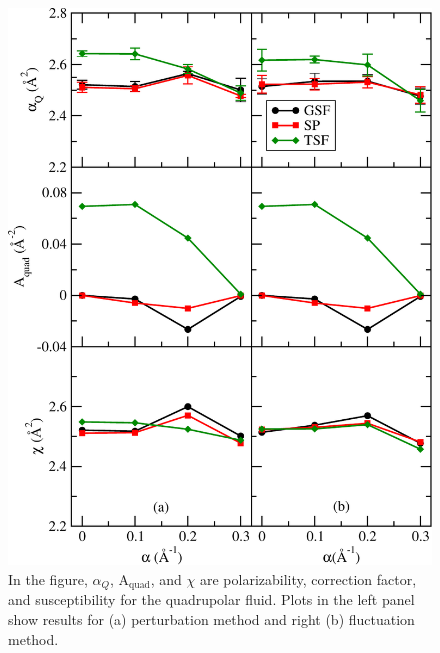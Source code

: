 \begin{figure}
  \centering
  \includegraphics[width=\linewidth]{polarizabilityFinal_Quad.pdf}
\caption{In the figure, $\alpha_Q$, $\mathrm{A}_\mathrm{quad}$, and $\chi$  are polarizability, correction factor, and susceptibility for the quadrupolar fluid. Plots in the left panel show results for (a) perturbation method and right (b) fluctuation method.}
\label{fig:dielectricQuad}
\end{figure}

